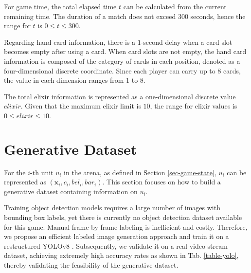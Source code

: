 \documentclass[runningheads]{llncs}
\def\bd{\boldsymbol}        %
\begin{document}
For game time, the total elapsed time $t$ can be calculated from the current remaining time.
The duration of a match does not exceed $300$ seconds, hence the range for $t$ is $0 \leq t \leq 300$.

Regarding hand card information, there is a $1$-second delay when a card slot becomes empty after using a card.
When card slots are not empty, the hand card information is composed of the category of cards in each position,
denoted as a four-dimensional discrete coordinate. Since each player can carry up to $8$ cards,
the value in each dimension ranges from $1$ to $8$.

The total elixir information is represented as a one-dimensional discrete value $elixir$.
Given that the maximum elixir limit is $10$, the range for elixir values is $0 \leq elixir \leq 10$.

\section{Generative Dataset}\label{sec-generation-dataset}
For the $i$-th unit $u_i$ in the arena, as defined in Section \ref{sec-game-state},
$u_i$ can be represented as $(\bd{x}_i, c_i, bel_i, bar_i)$.
This section focuses on how to build a generative dataset containing information on $u_i$.

Training object detection models requires a large number of images with bounding box labels,
yet there is currently no object detection dataset available for this game.
Manual frame-by-frame labeling is inefficient and costly. Therefore,
we propose an efficient labeled image generation approach and train it on a restructured YOLOv8 \cite{YOLOv8}.
Subsequently, we validate it on a real video stream dataset,
achieving extremely high accuracy rates as shown in Tab. \ref{table-yolo},
thereby validating the feasibility of the generative dataset.
\end{document}
